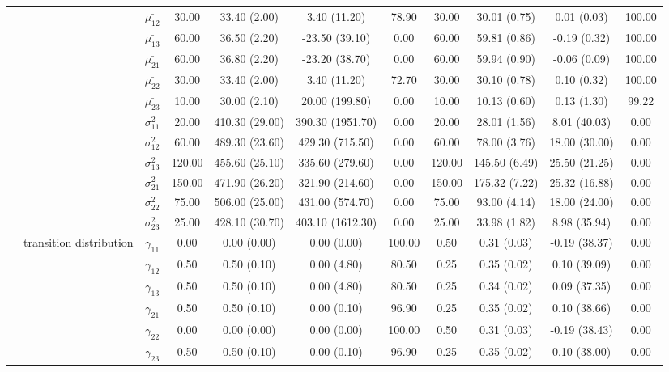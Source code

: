 \begin{table}[h]
{\begin{tabular}{ccccccccccc}
 & \multirow{11}{*}{} & $\bar{\mu_{12}}$ & 30.00 & 33.40 (2.00) & 3.40 (11.20) & 78.90 & 30.00 & 30.01 (0.75) & 0.01 (0.03) & 100.00 \\
 &  & $\bar{\mu_{13}}$ & 60.00 & 36.50 (2.20) & -23.50 (39.10) & 0.00 & 60.00 & 59.81 (0.86) & -0.19 (0.32) & 100.00 \\
 &  & $\bar{\mu_{21}}$ & 60.00 & 36.80 (2.20) & -23.20 (38.70) & 0.00 & 60.00 & 59.94 (0.90) & -0.06 (0.09) & 100.00 \\
 &  & $\bar{\mu_{22}}$ & 30.00 & 33.40 (2.00) & 3.40 (11.20) & 72.70 & 30.00 & 30.10 (0.78) & 0.10 (0.32) & 100.00 \\
 &  & $\bar{\mu_{23}}$ & 10.00 & 30.00 (2.10) & 20.00 (199.80) & 0.00 & 10.00 & 10.13 (0.60) & 0.13 (1.30) & 99.22 \\
 &  & $\sigma^2_{11}$ & 20.00 & 410.30 (29.00) & 390.30 (1951.70) & 0.00 & 20.00 & 28.01 (1.56) & 8.01 (40.03) & 0.00 \\
 &  & $\sigma^2_{12}$ & 60.00 & 489.30 (23.60) & 429.30 (715.50) & 0.00 & 60.00 & 78.00 (3.76) & 18.00 (30.00) & 0.00 \\
 &  & $\sigma^2_{13}$ & 120.00 & 455.60 (25.10) & 335.60 (279.60) & 0.00 & 120.00 & 145.50 (6.49) & 25.50 (21.25) & 0.00 \\
 &  & $\sigma^2_{21}$ & 150.00 & 471.90 (26.20) & 321.90 (214.60) & 0.00 & 150.00 & 175.32 (7.22) & 25.32 (16.88) & 0.00 \\
 &  & $\sigma^2_{22}$ & 75.00 & 506.00 (25.00) & 431.00 (574.70) & 0.00 & 75.00 & 93.00 (4.14) & 18.00 (24.00) & 0.00 \\
 &  & $\sigma^2_{23}$ & 25.00 & 428.10 (30.70) & 403.10 (1612.30) & 0.00 & 25.00 & 33.98 (1.82) & 8.98 (35.94) & 0.00 \\
 & transition distribution & $\gamma_{11}$ & 0.00 & 0.00 (0.00) & 0.00 (0.00) & 100.00 & 0.50 & 0.31 (0.03) & -0.19 (38.37) & 0.00 \\
 & \multirow{8}{*}{} & $\gamma_{12}$ & 0.50 & 0.50 (0.10) & 0.00 (4.80) & 80.50 & 0.25 & 0.35 (0.02) & 0.10 (39.09) & 0.00 \\
 &  & $\gamma_{13}$ & 0.50 & 0.50 (0.10) & 0.00 (4.80) & 80.50 & 0.25 & 0.34 (0.02) & 0.09 (37.35) & 0.00 \\
 &  & $\gamma_{21}$ & 0.50 & 0.50 (0.10) & 0.00 (0.10) & 96.90 & 0.25 & 0.35 (0.02) & 0.10 (38.66) & 0.00 \\
 &  & $\gamma_{22}$ & 0.00 & 0.00 (0.00) & 0.00 (0.00) & 100.00 & 0.50 & 0.31 (0.03) & -0.19 (38.43) & 0.00 \\
 &  & $\gamma_{23}$ & 0.50 & 0.50 (0.10) & 0.00 (0.10) & 96.90 & 0.25 & 0.35 (0.02) & 0.10 (38.00) & 0.00 \\

\end{tabular}}
\end{table}
